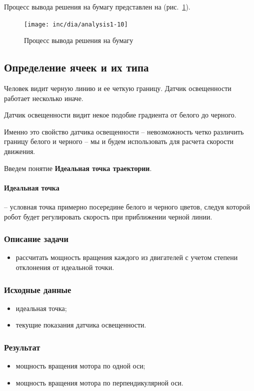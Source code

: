 Процесс вывода решения на бумагу представлен на (рис.~\ref{fig:fig10}).
\begin{figure}[ht]
	\centering
	\texttt{[image: inc/dia/analysis1-10]}
	\caption{Процесс вывода решения на бумагу}
  \label{fig:fig10}
\end{figure}

\subsection{Определение ячеек и их типа}

Человек видит черную линию и ее четкую границу. Датчик освещенности работает несколько иначе.

Датчик освещенности видит некое подобие градиента от белого до черного.

Именно это свойство датчика освещенности – невозможность четко различить границу белого и черного – мы и будем использовать для расчета скорости движения.

Введем понятие \textbf{Идеальная точка траектории}.

\paragraph{Идеальная точка} – условная точка примерно посередине белого и черного цветов, следуя которой робот будет регулировать скорость при приближении черной линии.

\subsubsection*{Описание задачи}
\begin{itemize}
\item рассчитать мощность вращения каждого из двигателей с учетом степени отклонения от идеальной точки.	
\end{itemize}


\subsubsection*{Исходные данные}
\begin{itemize}
\item идеальная точка;
\item текущие показания датчика освещенности.	
\end{itemize}


\subsubsection*{Результат}
\begin{itemize}
\item мощность вращения мотора по одной оси;
\item мощность вращения мотора по перпендикулярной оси.	
\end{itemize}



